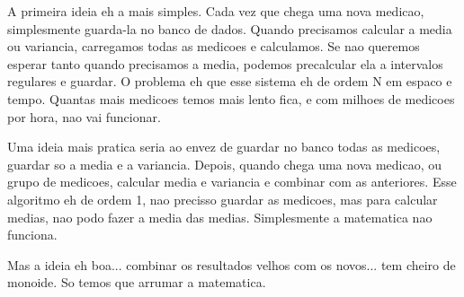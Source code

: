 \documentclass{beamer}
\begin{document}
\begin{frame}
{    \hrulefill

    A primeira ideia eh a mais simples. Cada vez que chega uma nova medicao,
    simplesmente guarda-la no banco de dados. Quando precisamos calcular a media
    ou variancia, carregamos todas as medicoes e calculamos. Se nao queremos
    esperar tanto quando precisamos a media, podemos precalcular ela a
    intervalos regulares e guardar. O problema eh que esse sistema eh de ordem N
    em espaco e tempo. Quantas mais medicoes temos mais lento fica, e com
    milhoes de medicoes por hora, nao vai funcionar.

    \hrulefill

    Uma ideia mais pratica seria ao envez de guardar no banco todas as medicoes,
    guardar so a media e a variancia. Depois, quando chega uma nova medicao, ou
    grupo de medicoes, calcular media e variancia e combinar com as anteriores.
    Esse algoritmo eh de ordem 1, nao precisso guardar as medicoes, mas para
    calcular medias, nao podo fazer a media das medias. Simplesmente a
    matematica nao funciona.

    Mas a ideia eh boa... combinar os resultados velhos com os novos... tem
    cheiro de monoide. So temos que arrumar a matematica.
  }
\end{frame}
\end{document}
